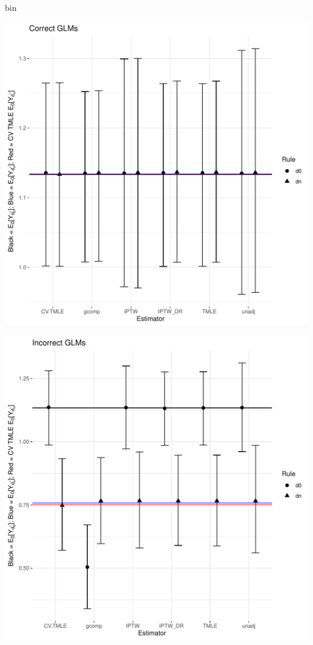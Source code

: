 \documentclass[11pt]{article}\usepackage[]{graphicx}\usepackage[]{color}
\makeatletter
\def\maxwidth{ %
  \ifdim\Gin@nat@width>\linewidth
    \linewidth
  \else
    \Gin@nat@width
  \fi
}
\newenvironment{knitrout}{}{} %
\makeatother
\begin{document}
bin







\begin{knitrout}
\color{fgcolor}
\includegraphics[width=\maxwidth]{figure/unnamed-chunk-1-1} 

\includegraphics[width=\maxwidth]{figure/unnamed-chunk-1-2} 


\end{knitrout}
\end{document}

